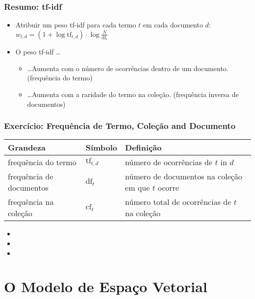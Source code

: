 \documentclass[compress]{beamer}
\def\mygreen#1{\textcolor{texgreen}{#1}}
\begin{document}
\begin{frame}[<+->]
\frametitle{Resumo: tf-idf}
\pause[2]
\begin{itemize}
\item Atribuir um peso tf-idf para cada termo $t$ em cada documento $d$:
$ w_{t,d} = (1 +\log \mbox{tf}_{t,d}) \cdot \log \frac{N}{\mbox{df}_t}$
\item O peso tf-idf  \ldots
\begin{itemize}
\item \ldots Aumenta com o número de ocorrências dentro de um documento. (frequência do termo)
\item \ldots Aumenta com a raridade do termo na coleção. (frequência inversa de documentos)
\end{itemize}
\end{itemize}
\end{frame}


\begin{frame}\frametitle{Exercício: Frequência de Termo, Coleção and Documento}

\bigskip

\begin{tabular}{@{}llp{5cm}@{}}
Grandeza & Símbolo & Definição\\\hline
frequência do termo & $\mbox{tf}_{t,d}$ & número de ocorrências de $t$ in $d$\\
frequência de documentos  & $\mbox{df}_t$ & número de documentos na coleção em que $t$
ocorre\\
frequência na coleção & $\mbox{cf}_t$ & número total de ocorrências de $t$ na coleção
\end{tabular}

\vspace{1cm}

\begin{itemize}
\item \visible<1>{\mygreen{Relação entre df e cf?}}
\item \visible<1>{\mygreen{Relação entre tf e cf?}}
\item \visible<1>{\mygreen{Relação entre tf e df?}}
\end{itemize}

\end{frame}


\section{O Modelo de Espaço Vetorial}
\end{document}
